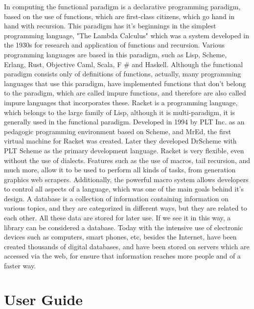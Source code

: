 \documentclass[12pt]{article}
\begin{document}
In computing the functional paradigm is a declarative programming paradigm, based on the use of functions, which are first-class citizens, which go hand in hand with recursion. This paradigm has it's beginnings in the simplest programming language, "The Lambda Calculus" which was a system developed in the 1930s for research and application of functions and recursion. Various programming languages are based in this paradigm, such as Lisp, Scheme, Erlang, Rust, Objective Caml, Scala, F \# and Haskell. Although the functional paradigm consists only of definitions of functions, actually, many programming languages that use this paradigm, have implemented functions that don't belong to the paradigm, which are called impure functions, and therefore are also called impure languages that incorporates these.
\newline
Racket is a programming language, which belongs to the large family of Lisp, although it is multi-paradigm, it is generally used in the functional paradigm. Developed in 1994 by PLT Inc. as an pedagogic programming environment based on Scheme, and MrEd, the first virtual machine for Racket was created. Later they developed DrScheme with PLT Scheme as the primary development language. Racket is very flexible, even without the use of dialects. Features such as the use of macros, tail recursion, and much more, allow it to be used to perform all kinds of tasks, from generation graphics web scrapers. Additionally, the powerful macro system allows developers to control all aspects of a language, which was one of the main goals behind it's design.
\newline
A database is a collection of information containing information on various topics, and they are categorized in different ways, but they are related to each other. All these data are stored for later use. If we see it in this way, a library can be considered a database. Today with the intensive use of electronic devices such as computers, smart phones, etc, besides the Internet, have been created thousands of digital databases, and have been stored on servers which are accessed via the web, for ensure that information reaches more people and of a faster way.
\newpage

\section{User Guide}
\end{document}
